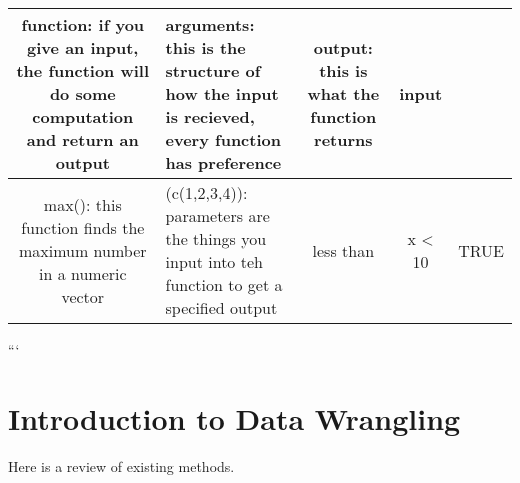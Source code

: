 \documentclass[
]{book}
\begin{document}
\begin{longtable}[]{@{}clccc@{}}
\toprule
\begin{minipage}[b]{0.12\columnwidth}\centering
function: if you give an input, the function will do some computation and return an output\strut
\end{minipage} & \begin{minipage}[b]{0.27\columnwidth}\raggedright
arguments: this is the structure of how the input is recieved, every function has preference\strut
\end{minipage} & \begin{minipage}[b]{0.31\columnwidth}\centering
output: this is what the function returns\strut
\end{minipage} & \begin{minipage}[b]{0.08\columnwidth}\centering
input\strut
\end{minipage} & \begin{minipage}[b]{0.08\columnwidth}\centering
\strut
\end{minipage}\tabularnewline
\midrule
\endhead
\begin{minipage}[t]{0.12\columnwidth}\centering
max(): this function finds the maximum number in a numeric vector\strut
\end{minipage} & \begin{minipage}[t]{0.27\columnwidth}\raggedright
(c(1,2,3,4)): parameters are the things you input into teh function to get a specified output\strut
\end{minipage} & \begin{minipage}[t]{0.31\columnwidth}\centering
less than\strut
\end{minipage} & \begin{minipage}[t]{0.08\columnwidth}\centering
x \textless{} 10\strut
\end{minipage} & \begin{minipage}[t]{0.08\columnwidth}\centering
TRUE\strut
\end{minipage}\tabularnewline
\bottomrule
\end{longtable}

```

\hypertarget{introduction-to-data-wrangling}{%
\chapter{Introduction to Data Wrangling}\label{introduction-to-data-wrangling}}

Here is a review of existing methods.
\end{document}
